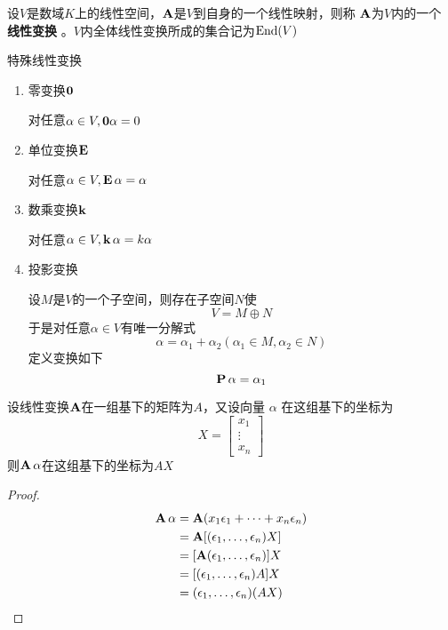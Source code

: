 \documentclass[11pt]{article}
\begin{document}
\begin{definition}[]
设\(V\)是数域\(K\)上的线性空间，\(\operatorname{\textbf{A}}\)是\(V\)到自身的一个线性映射，则称
\(\operatorname{\textbf{A}}\)为\(V\)内的一个 \textbf{线性变换} 。\(V\)内全体线性变换所成的集合记为\(\operatorname{End}(V)\)
\end{definition}

特殊线性变换
\begin{enumerate}
\item 零变换\(\mathbf{0}\)

对任意\(\alpha\in V,\mathbf{0}\alpha=0\)

\item 单位变换\(\operatorname{\textbf{E}}\)

对任意\(\alpha\in V,\operatorname{\textbf{E}}\alpha=\alpha\)

\item 数乘变换\(\operatorname{\textbf{k}}\)

对任意\(\alpha\in V,\operatorname{\textbf{k}}\alpha=k\alpha\)

\item 投影变换

设\(M\)是\(V\)的一个子空间，则存在子空间\(N\)使
\begin{equation*}
V=M\oplus N
\end{equation*}
于是对任意\(\alpha\in V\)有唯一分解式
\begin{equation*}
\alpha=\alpha_1+\alpha_2(\alpha_1\in M,\alpha_2\in N)
\end{equation*}
定义变换如下
\begin{equation*}
\operatorname{\textbf{P}}\alpha=\alpha_1
\end{equation*}
\end{enumerate}





\begin{proposition}[]
\label{prop4.3.8}
设线性变换\(\operatorname{\textbf{A}}\)在一组基下的矩阵为\(A\)，又设向量 \(\alpha\) 在这组基下的坐标为
\begin{equation*}
X=
\begin{bmatrix}
x_1\\\vdots\\x_n
\end{bmatrix}
\end{equation*}
则\(\operatorname{\textbf{A}}\alpha\)在这组基下的坐标为\(AX\)
\end{proposition}

\begin{proof}
\begin{align*}
\operatorname{\textbf{A}}\alpha&=\operatorname{\textbf{A}}(x_1\epsilon_1+\dots+x_n\epsilon_n)\\
&=\operatorname{\textbf{A}}[(\epsilon_1,\dots,\epsilon_n)X]\\
&=[\operatorname{\textbf{A}}(\epsilon_1,\dots,\epsilon_n)]X\\
&=[(\epsilon_1,\dots,\epsilon_n)A]X\\
&=(\epsilon_1,\dots,\epsilon_n)(AX)
\end{align*}
\end{proof}
\end{document}
